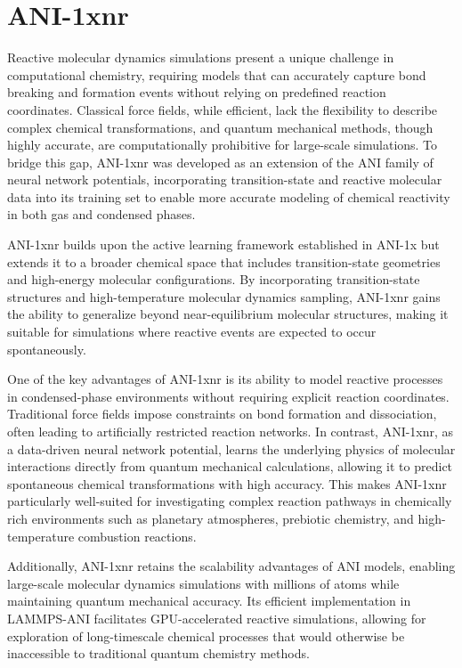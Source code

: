 \section{ANI-1xnr}
\label{sec:ani-1xnr}
Reactive molecular dynamics simulations present a unique challenge in computational chemistry, requiring models that can accurately capture bond breaking and formation events without relying on predefined reaction coordinates. Classical force fields, while efficient, lack the flexibility to describe complex chemical transformations, and quantum mechanical methods, though highly accurate, are computationally prohibitive for large-scale simulations. To bridge this gap, ANI-1xnr \cite{ani-1xnr} was developed as an extension of the ANI family of neural network potentials, incorporating transition-state and reactive molecular data into its training set to enable more accurate modeling of chemical reactivity in both gas and condensed phases.

ANI-1xnr builds upon the active learning framework established in ANI-1x but extends it to a broader chemical space that includes transition-state geometries and high-energy molecular configurations. By incorporating transition-state structures and high-temperature molecular dynamics sampling, ANI-1xnr gains the ability to generalize beyond near-equilibrium molecular structures, making it suitable for simulations where reactive events are expected to occur spontaneously.

One of the key advantages of ANI-1xnr is its ability to model reactive processes in condensed-phase environments without requiring explicit reaction coordinates. Traditional force fields impose constraints on bond formation and dissociation, often leading to artificially restricted reaction networks. In contrast, ANI-1xnr, as a data-driven neural network potential, learns the underlying physics of molecular interactions directly from quantum mechanical calculations, allowing it to predict spontaneous chemical transformations with high accuracy. This makes ANI-1xnr particularly well-suited for investigating complex reaction pathways in chemically rich environments such as planetary atmospheres, prebiotic chemistry, and high-temperature combustion reactions. \cite{ani-1xnr}

Additionally, ANI-1xnr retains the scalability advantages of ANI models, enabling large-scale molecular dynamics simulations with millions of atoms while maintaining quantum mechanical accuracy. Its efficient implementation in LAMMPS-ANI facilitates GPU-accelerated reactive simulations, allowing for exploration of long-timescale chemical processes that would otherwise be inaccessible to traditional quantum chemistry methods.

